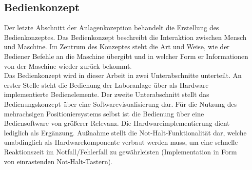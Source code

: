 \documentclass[../../../Bachelorarbeit.tex]{subfiles}
\begin{document}
\subsection{Bedienkonzept}
Der letzte Abschnitt der Anlagenkozeption behandelt die Erstellung des Bedienkonzeptes. Das Bedienkonzept beschreibt die Interaktion zwischen Mensch und Maschine. Im Zentrum des Konzeptes steht die Art und Weise, wie der Bediener Befehle an die Maschine übergibt und in welcher Form er Informationen von der Maschine wieder zurück bekommt. \\ %
Das Bedienkonzept wird in dieser Arbeit in zwei Unterabschnitte unterteilt. An erster Stelle steht die Bedienung der Laboranlage über als Hardware implementierte Bedienelemente. Der zweite Unterabschnitt stellt das Bedienungskonzept über eine Softwarevisualisierung dar. Für die Nutzung des mehrachsigen Positioniersystems selbst ist die Bedienung über eine Bediensoftware von größerer Relevanz. Die Hardwareimplementierung dient lediglich als Ergänzung. Außnahme stellt die Not-Halt-Funktionalität dar, welche unabdinglich als Hardwarekomponente verbaut werden muss, um eine schnelle Reaktionszeit im Notfall/Fehlerfall zu gewährleisten (Implementation in Form von einrastenden Not-Halt-Tastern).
\end{document}
